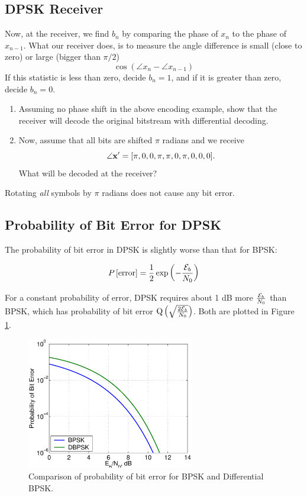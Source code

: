 \subsection{DPSK Receiver}

Now, at the receiver, we
find $b_n$ by comparing the phase of $x_{n}$ to the phase of $x_{n-1}$.  
What our receiver does, is to measure the angle difference is small (close to zero) or large (bigger than $\pi/2$)
\[
   \cos (\angle x_n - \angle x_{n-1})
\]
If this statistic is less than zero, decide $b_n=1$, and if
it is greater than zero, decide $b_n=0$.


\begin{enumerate}
\item Assuming no phase shift in the above encoding example, show that the receiver
will decode the original bitstream with differential decoding.
 \item Now, assume that all bits are shifted $\pi$ radians and we
 receive
\[
\angle \mathbf{x}'   = [\pi, 0, 0, \pi, \pi,  0, \pi, 0, 0, 0].
\]
 What will be decoded at the receiver?
\Solution{
\[
\hat{b}_n = [1, 0, 1,   0,    1,   1, 1, 0, 0 ].
\]
}
\end{enumerate}
Rotating \emph{all} symbols by $\pi$ radians does not cause any bit error.

\subsection{Probability of Bit Error for DPSK}

The probability of bit error in DPSK is slightly worse than that for BPSK:

\[
 P\left[{\mbox{error}}\right] = \frac{1}{2} \exp\left( -\frac{\mathcal{E}_b}{N_0} \right) 
\]

For a constant probability of error, DPSK requires about 1 dB more $\frac{\mathcal{E}_b}{N_0}$ than BPSK, which has probability of bit error ${\mbox{Q}\left( {\sqrt{\frac{2\mathcal{E}_b}{N_0}}} \right)}$.  Both are plotted in Figure \ref{F:bpsk_vs_dpsk}.

\begin{figure}[htbp]
  \centerline{\includegraphics[width=0.65\textwidth]{../images/plotPbiterror_DPSK.eps}}
  \caption{Comparison of probability of bit error for BPSK and Differential BPSK.}
  \label{F:bpsk_vs_dpsk}
\end{figure}

